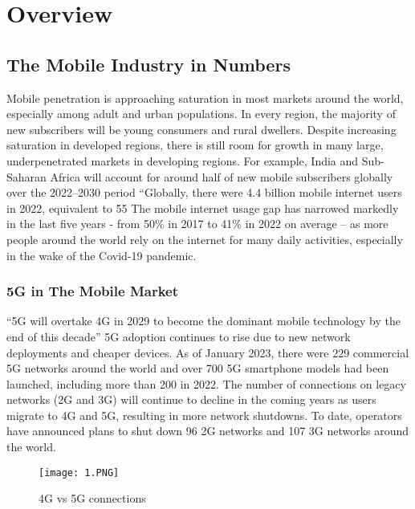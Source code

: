 \chapter{Overview}

\section{The Mobile Industry in Numbers}
Mobile penetration is approaching saturation in most markets around the world, especially among adult and urban populations. In every region, the majority of new subscribers will be young consumers and rural dwellers.
Despite increasing saturation in developed regions, there is still room for growth in many large, underpenetrated markets in developing regions. For example, India and Sub-Saharan Africa will account for around half of new mobile subscribers globally over the 2022–2030 period
“Globally, there were 4.4 billion mobile internet users in 2022, equivalent to 55%
The mobile internet usage gap has narrowed markedly in the last five years - from 50\% in 2017 to 41\% in 2022 on average – as more people around the world rely on the internet for many daily activities, especially in the wake of the Covid-19 pandemic. 
\subsection{5G in The Mobile Market}
“5G will overtake 4G in 2029 to become the dominant mobile technology by the end of this decade”
5G adoption continues to rise due to new network deployments and cheaper devices. As of January 2023, there were 229 commercial 5G networks around the world and over 700 5G smartphone models had been launched, including more than 200 in 2022. 
The number of connections on legacy networks (2G and 3G) will continue to decline in the coming years as users migrate to 4G and 5G, resulting in more network shutdowns. To date, operators have announced plans to shut down 96 2G networks and 107 3G networks around the world.

\begin{figure}[h]
\centering
\texttt{[image: 1.PNG]}
\caption{4G vs 5G connections }
\label{fig:figure1.1}
\end{figure}



